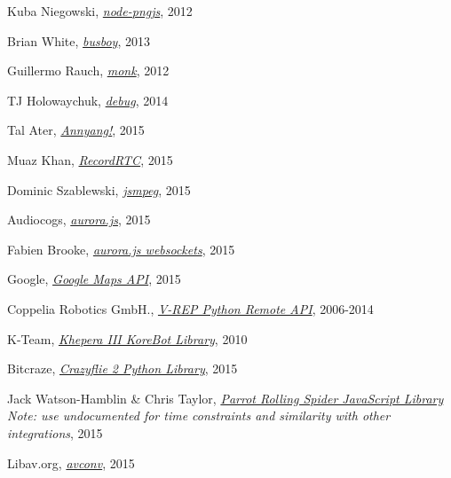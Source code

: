 \begin{thebibliography}{99}
Kuba Niegowski,
\emph{\href{https://github.com/niegowski/node-pngjs}{node-pngjs}},  
2012

Brian White,
\emph{\href{https://github.com/mscdex/busboy}{busboy}},  
2013

Guillermo Rauch,
\emph{\href{https://github.com/Automattic/monk}{monk}},  
2012

TJ Holowaychuk,
\emph{\href{https://github.com/visionmedia/debug}{debug}},  
2014

Tal Ater,
\emph{\href{https://github.com/TalAter/annyang}{Annyang!}},  
2015

Muaz Khan,
\emph{\href{https://github.com/muaz-khan/WebRTC-Experiment/tree/master/RecordRTC}{RecordRTC}},  
2015

Dominic Szablewski,
\emph{\href{https://github.com/phoboslab/jsmpeg}{jsmpeg}},  
2015

Audiocogs,
\emph{\href{https://github.com/audiocogs/aurora.js/}{aurora.js}},  
2015

Fabien Brooke,
\emph{\href{https://github.com/fsbdev/aurora-websocket}{aurora.js websockets}},  
2015

Google,
\emph{\href{https://developers.google.com/maps/?hl=en}{Google Maps API}},  
2015

Coppelia Robotics GmbH.,
\emph{\href{http://www.coppeliarobotics.com/helpFiles/en/remoteApiFunctionsPython.htm}{V-REP Python Remote API}},  
2006-2014 

K-Team,
\emph{\href{http://ftp.k-team.com/korebot/libkorebot-doc/main.html}{Khepera III KoreBot Library}},  
2010

Bitcraze,
\emph{\href{https://github.com/bitcraze/crazyflie-clients-python}{Crazyflie 2 Python Library}},  
2015

Jack Watson-Hamblin \& Chris Taylor,
\emph{\href{https://github.com/voodootikigod/node-rolling-spider}{Parrot Rolling Spider JavaScript Library} Note: use undocumented for time constraints and similarity with other integrations},  
2015

Libav.org,
\emph{\href{https://libav.org/}{avconv}},  
2015

\end{thebibliography}